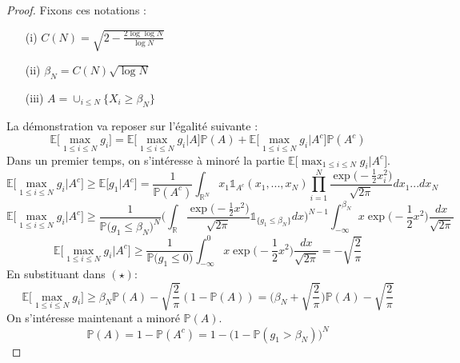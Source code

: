 \documentclass{report}
\begin{document}
\begin{proof}
	Fixons ces notations :
	\begin{enumerate}
		\item[(i)] $C(N) = \sqrt{2-\frac{2 \log\log N}{\log N}}$
		\item[(ii)] $\beta_N = C(N)\sqrt{\log N}$
		\item[(iii)] $A= \cup_{i \leq N}\Big\{X_i\geq \beta_N \Big\}$
	\end{enumerate}
	La démonstration va reposer sur l'égalité suivante :
	\begin{equation}
	\tag{$\star$}
	\mathbb{E}\Big[\max_{1\leq i \leq N}g_i\Big] = \mathbb{E}\Big[\max_{1\leq i \leq N}g_i \big| A\Big] \mathbb{P}(A)+\mathbb{E}\Big[\max_{1\leq i \leq N}g_i \big| A^{c}\Big] \mathbb{P}(A^{c})
	\end{equation}
	Dans un premier temps, on s'intéresse à minoré la partie $\mathbb{E}\Big[\max_{1\leq i \leq N}g_i \big| A^{c}\Big]$.
	\begin{equation*}
	\mathbb{E}\Big[\max_{1\leq i \leq N}g_i \big| A^{c}\Big]\geq \mathbb{E}\Big[g_1 \big| A^{c}\Big]=\frac{1}{\mathbb{P}(A^c)} \int_{\mathbb{R}^N} x_1 \mathbb{1}_{A^c}(x_1,...,x_N) \prod_{i=1}^{N} \frac{\exp\big(-\frac{1}{2}x_i^2\big)}{\sqrt{2\pi}} dx_1 ... dx_N
	\end{equation*}
	\begin{equation*}
	\mathbb{E}\Big[\max_{1\leq i \leq N}g_i \big| A^{c}\Big]\geq \frac{1}{\mathbb{P}\big(g_1\leq \beta_N\big)^{N}} \Big(\int_{\mathbb{R}} \frac{\exp\big(-\frac{1}{2}x^2\big)}{\sqrt{2\pi}}\mathbb{1}_{\{g_1\leq \beta_N\}} dx\Big)^{N-1}\int_{-\infty}^{\beta_N}x \exp\big(-\frac{1}{2}x^2\big) \frac{dx}{\sqrt{2\pi}} 
	\end{equation*}
	\begin{equation*}
	\mathbb{E}\Big[\max_{1\leq i \leq N}g_i \big| A^{c}\Big]\geq \frac{1}{\mathbb{P}\big(g_1\leq 0\big)} \int_{-\infty}^{0}x \exp\big(-\frac{1}{2}x^2\big) \frac{dx}{\sqrt{2\pi}} = -\sqrt{\frac{2}{\pi}}
	\end{equation*}
	En substituant dans $(\star)$:
	\begin{equation*}
	\mathbb{E}\Big[\max_{1\leq i \leq N}g_i\Big] \geq \beta_N \mathbb{P}(A)-\sqrt{\frac{2}{\pi}}(1-\mathbb{P}(A))=\big(\beta_N+\sqrt{\frac{2}{\pi}}\big)\mathbb{P}(A)-\sqrt{\frac{2}{\pi}}
	\end{equation*}
	On s'intéresse maintenant a minoré $ \mathbb{P}(A)$.
	\begin{equation*}
	\mathbb{P}(A) = 1-\mathbb{P}(A^c)=1-\big(1-\mathbb{P}(g_1> \beta_N)\big)^N

\end{equation*}
\end{proof}
\end{document}
